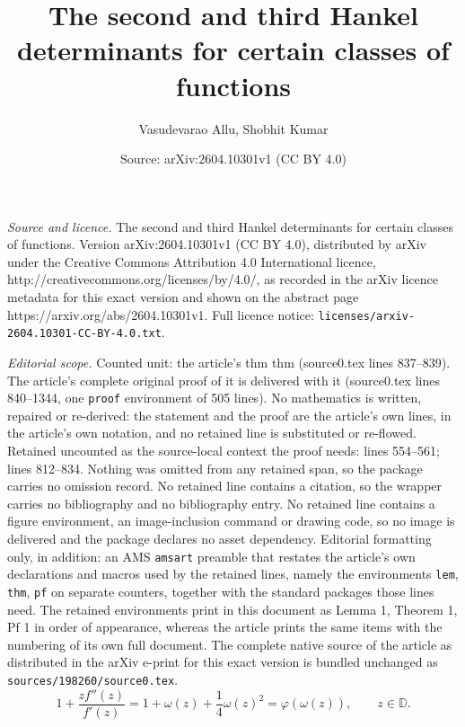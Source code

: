 \documentclass[10pt,a4paper]{amsart}
\title{{The second and third Hankel determinants for certain classes of functions}}
\author{Vasudevarao Allu, Shobhit Kumar}
\date{Source: arXiv:2604.10301v1 (CC BY 4.0)}
\begin{document}
\maketitle

\noindent\emph{Source and licence.} {The second and third Hankel determinants for certain classes of functions}. Version arXiv:2604.10301v1 (CC BY 4.0), distributed by arXiv under the Creative Commons Attribution 4.0 International licence, http://creativecommons.org/licenses/by/4.0/, as recorded in the arXiv licence metadata for this exact version and shown on the abstract page https://arxiv.org/abs/2604.10301v1. Full licence notice: \texttt{licenses/arxiv-2604.10301-CC-BY-4.0.txt}.\par\smallskip

\noindent\textit{Editorial scope.} Counted unit: the article's thm thm (source0.tex lines 837--839). The article's complete original proof of it is delivered with it (source0.tex lines 840--1344, one \texttt{proof} environment of 505 lines). No mathematics is written, repaired or re-derived: the statement and the proof are the article's own lines, in the article's own notation, and no retained line is substituted or re-flowed.  Retained uncounted as the source-local context the proof needs: lines 554--561; lines 812--834.  Nothing was omitted from any retained span, so the package carries no omission record.  No retained line contains a citation, so the wrapper carries no bibliography and no bibliography entry.  No retained line contains a figure environment, an image-inclusion command or drawing code, so no image is delivered and the package declares no asset dependency.  Editorial formatting only, in addition: an AMS \texttt{amsart} preamble that restates the article's own declarations and macros used by the retained lines, namely the environments \texttt{lem}, \texttt{thm}, \texttt{pf} on separate counters, together with the standard packages those lines need.  The retained environments print in this document as Lemma 1, Theorem 1, Pf 1 in order of appearance, whereas the article prints the same items with the numbering of its own full document.  The complete native source of the article as distributed in the arXiv e-print for this exact version is bundled unchanged as \texttt{sources/198260/source0.tex}.
\begin{equation}\label{eq:3.6}
1+\frac{z f''(z)}{f'(z)}
=
1+\omega(z)+\frac{1}{4}\omega(z)^2
=
\varphi(\omega(z)),
\qquad z\in \mathbb{D}.
\end{equation}
\end{document}
